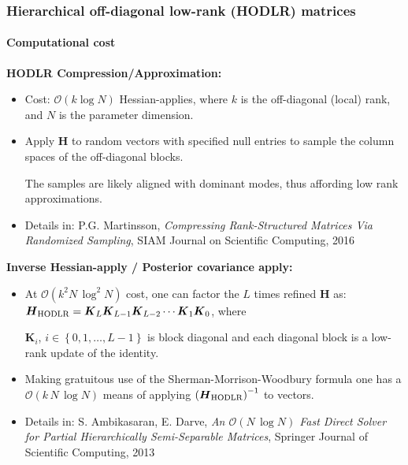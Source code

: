 \documentclass[10pt,final,xcolor=dvipsnames]{beamer}
\newcommand{\bs}[1]{\ensuremath{\boldsymbol{#1}}}
\begin{document}
\begin{frame}
  \frametitle{Hierarchical off-diagonal low-rank (HODLR) matrices}
  \framesubtitle{Computational cost}
\noindent \textbf{HODLR Compression/Approximation:}
\begin{itemize}
\item Cost: $\mathcal{O} (k \log N)$ Hessian-applies, where $k$ is the
  off-diagonal (local) rank, and $N$ is the parameter dimension.
\item Apply $\bs{H}$ to random vectors with specified null entries to
  sample the column spaces of the off-diagonal blocks.
\vspace{1mm}

The samples are likely aligned with dominant modes, thus affording low
rank approximations.

\item [] \scriptsize{Details in: P.G. Martinsson, {\em Compressing
    Rank-Structured Matrices Via Randomized Sampling}, SIAM Journal on
  Scientific Computing, 2016}
\end{itemize}
\vspace{1mm}

\noindent \textbf{Inverse Hessian-apply / Posterior covariance apply:}
\begin{itemize}
\item At $\mathcal{O}\left(k^2 N\,\log^{2} N \right)$ cost, one can
  factor the $L$ times refined $\boldsymbol{H}$ as:
  $\boldsymbol{H}_{\rm
    HODLR}=\boldsymbol{K}_{L}\boldsymbol{K}_{L-1}\boldsymbol{K}_{L-2}\cdots\boldsymbol{K}_{1}\boldsymbol{K}_{0}$,
  where

$\bs{K}_{i}$, $i\in\left\{0,1,\dots,L-1\right\}$ is block diagonal and
  each diagonal block is a low-rank update of the identity.
\item Making gratuitous use of the Sherman-Morrison-Woodbury formula
  one has a $\mathcal{O}\left(k \, N\,\log N \right)$ means of
  applying $\left(\bs{H}_{\rm HODLR}\right)^{-1}$ to vectors.
\item [] \scriptsize{Details in: S. Ambikasaran, E. Darve, {\em An
    $\mathcal{O}(N\, \log N)$ Fast Direct Solver for Partial
    Hierarchically Semi-Separable Matrices}, Springer Journal of
  Scientific Computing, 2013}
\end{itemize}
\vspace{1mm}
\end{frame}
\end{document}
